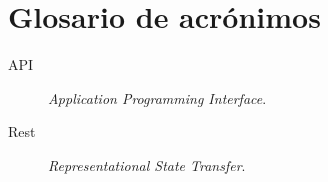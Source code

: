 \chapter{Glosario de acrónimos}
\label{chap:glosario-acronimos}


\begin{description}
 \item [API] \emph{Application Programming Interface}.
 \item [Rest] \emph{Representational State Transfer}.
\end{description}

